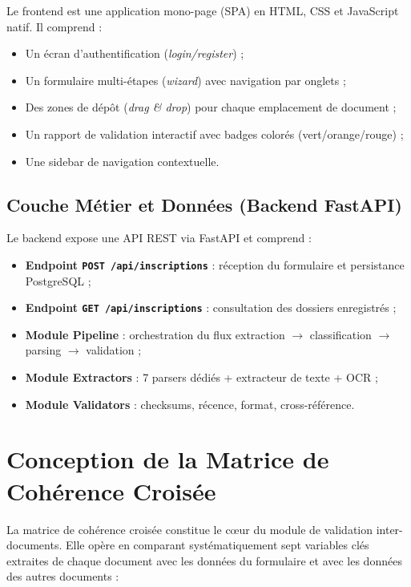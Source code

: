 Le frontend est une application mono-page (SPA) en HTML, CSS et JavaScript natif. Il comprend :
\begin{itemize}[leftmargin=*, itemsep=2pt]
    \item Un \'{e}cran d'authentification (\textit{login/register}) ;
    \item Un formulaire multi-\'{e}tapes (\textit{wizard}) avec navigation par onglets ;
    \item Des zones de d\'{e}p\^{o}t (\textit{drag \& drop}) pour chaque emplacement de document ;
    \item Un rapport de validation interactif avec badges color\'{e}s (vert/orange/rouge) ;
    \item Une sidebar de navigation contextuelle.
\end{itemize}

\subsection{Couche M\'{e}tier et Donn\'{e}es (Backend FastAPI)}

Le backend expose une API REST via FastAPI et comprend :
\begin{itemize}[leftmargin=*, itemsep=2pt]
    \item \textbf{Endpoint \texttt{POST /api/inscriptions}} : r\'{e}ception du formulaire et persistance PostgreSQL ;
    \item \textbf{Endpoint \texttt{GET /api/inscriptions}} : consultation des dossiers enregistr\'{e}s ;
    \item \textbf{Module Pipeline} : orchestration du flux extraction $\to$ classification $\to$ parsing $\to$ validation ;
    \item \textbf{Module Extractors} : 7 parsers d\'{e}di\'{e}s + extracteur de texte + OCR ;
    \item \textbf{Module Validators} : checksums, r\'{e}cence, format, cross-r\'{e}f\'{e}rence.
\end{itemize}

\section{Conception de la Matrice de Coh\'{e}rence Crois\'{e}e}

La matrice de coh\'{e}rence crois\'{e}e constitue le c\oe{}ur du module de validation inter-documents. Elle op\`{e}re en comparant syst\'{e}matiquement sept variables cl\'{e}s extraites de chaque document avec les donn\'{e}es du formulaire et avec les donn\'{e}es des autres documents :

